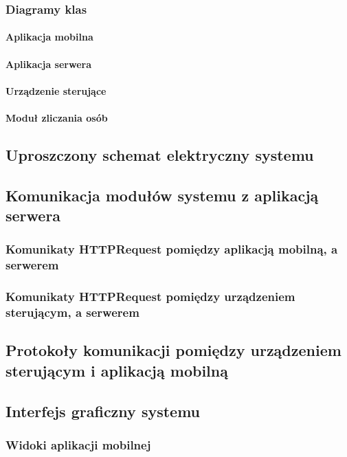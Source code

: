 	\subsubsection{Diagramy klas} 
	
		\paragraph{Aplikacja mobilna}
		\paragraph{Aplikacja serwera}
		\paragraph{Urządzenie sterujące}
		\paragraph{Moduł zliczania osób}
		
\subsection{Uproszczony schemat elektryczny systemu}

\subsection{Komunikacja modułów systemu z aplikacją  serwera}

	\subsubsection{Komunikaty HTTPRequest pomiędzy aplikacją mobilną, a serwerem}
	\subsubsection{Komunikaty HTTPRequest pomiędzy urządzeniem sterującym, a serwerem}
	\newpage
\subsection{Protokoły komunikacji pomiędzy urządzeniem sterującym i aplikacją mobilną}

\subsection{Interfejs graficzny systemu}

	\subsubsection{Widoki aplikacji mobilnej}
	
